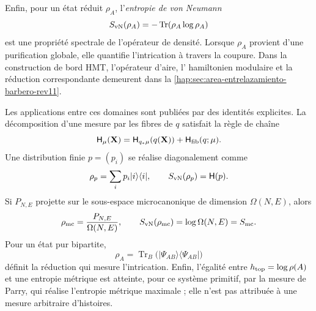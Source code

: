 Enfin, pour un état réduit \(\rho_A\), l’\emph{entropie de von
Neumann}
\[
 S_{\rm vN}(\rho_A)=-\operatorname{Tr}(\rho_A\log\rho_A)
\]
est une propriété spectrale de l'opérateur de densité. Lorsque \(\rho_A\)
provient d'une purification globale, elle quantifie l'intrication à travers
la coupure. Dans la construction de bord HMT, l'opérateur d'aire, l'
hamiltonien modulaire et la réduction correspondante demeurent dans la
\cref{hap:sec:area-entrelazamiento-barbero-rev11}.

Les applications entre ces domaines sont publiées par des identités explicites.
La décomposition d'une mesure par les fibres de \(q\) satisfait la règle de
chaîne
\begin{equation}
 \mathsf H_\mu(\mathbf X)
 =\mathsf H_{q_*\mu}(q(\mathbf X))
  +\mathsf H_{\rm fib}(q;\mu).
 \label{eq:cadena-entropia-fibras-rev2}
\end{equation}
Une distribution finie \(p=(p_i)\) se réalise diagonalement comme
\[
 \rho_p=\sum_i p_i|i\rangle\langle i|,
 \qquad S_{\rm vN}(\rho_p)=\mathsf H(p).
\]
Si \(P_{N,E}\) projette sur le sous-espace microcanonique de dimension
\(\Omega(N,E)\), alors
\[
 \rho_{\rm mc}=\frac{P_{N,E}}{\Omega(N,E)},
 \qquad S_{\rm vN}(\rho_{\rm mc})=\log\Omega(N,E)=S_{\rm mc}.
\]
Pour un état pur bipartite,
\[
 \rho_A=\operatorname{Tr}_B
 \bigl(|\Psi_{AB}\rangle\langle\Psi_{AB}|\bigr)
\]
définit la réduction qui mesure l'intrication. Enfin, l'égalité entre
\(h_{\rm top}=\log\rho(A)\) et une entropie métrique est atteinte, pour ce
système primitif, par la mesure de Parry, qui réalise l'entropie métrique
maximale ; elle n'est pas attribuée à une mesure arbitraire d'histoires.

